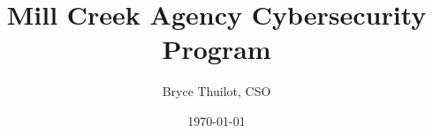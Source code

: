 \title{Mill Creek Agency Cybersecurity Program}
\author{Bryce Thuilot, CSO}
\date{\today}
\usepackage{tikz}
\usetikzlibrary{arrows,automata}
\usepackage{amsmath}
\usepackage{array}
\usepackage{hhline}
\usepackage{listings}
